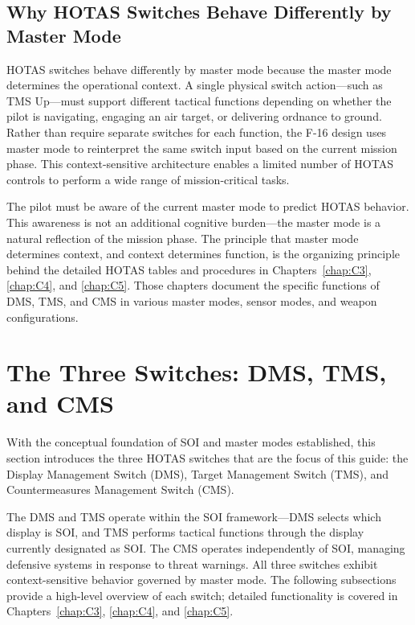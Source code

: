 \documentclass[11pt, a4paper, twoside]{report}
\begin{document}
\subsection{Why HOTAS Switches Behave Differently by Master Mode}
\label{sec:C2-S2-S2}

HOTAS switches behave differently by master mode because the master mode determines the operational context. A single physical switch action—such as TMS Up—must support different tactical functions depending on whether the pilot is navigating, engaging an air target, or delivering ordnance to ground. Rather than require separate switches for each function, the F-16 design uses master mode to reinterpret the same switch input based on the current mission phase. This context-sensitive architecture enables a limited number of HOTAS controls to perform a wide range of mission-critical tasks.

The pilot must be aware of the current master mode to predict HOTAS behavior. This awareness is not an additional cognitive burden—the master mode is a natural reflection of the mission phase. The principle that master mode determines context, and context determines function, is the organizing principle behind the detailed HOTAS tables and procedures in Chapters~\ref{chap:C3}, \ref{chap:C4}, and \ref{chap:C5}. Those chapters document the specific functions of DMS, TMS, and CMS in various master modes, sensor modes, and weapon configurations.

\section{The Three Switches: DMS, TMS, and CMS}
\label{sec:C2-S3}

With the conceptual foundation of SOI and master modes established, this section introduces the three HOTAS switches that are the focus of this guide: the Display Management Switch (DMS), Target Management Switch (TMS), and Countermeasures Management Switch (CMS).

The DMS and TMS operate within the SOI framework—DMS selects which display is SOI, and TMS performs tactical functions through the display currently designated as SOI. The CMS operates independently of SOI, managing defensive systems in response to threat warnings. All three switches exhibit context-sensitive behavior governed by master mode. The following subsections provide a high-level overview of each switch; detailed functionality is covered in Chapters~\ref{chap:C3}, \ref{chap:C4}, and \ref{chap:C5}.
\end{document}
